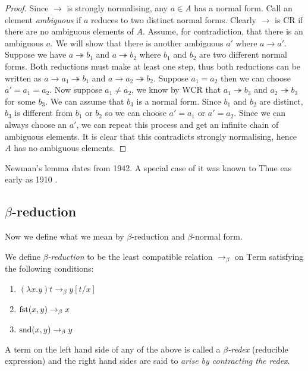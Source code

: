 \begin{proof}
    Since $\to$ is strongly normalising, any $a \in A$ has a normal form. Call an element \emph{ambiguous} if $a$ reduces to two distinct normal forms. Clearly $\to$ is CR if there are no ambiguous elements of $A$.
    Assume, for contradiction, that there is an ambiguous $a$. We will show that there is another ambiguous $a'$ where $a \to a'$.
    Suppose we have $a \twoheadrightarrow b_1$ and $a \twoheadrightarrow b_2$ where $b_1$ and $b_2$ are two different normal forms. Both reductions must make at least one step, thus both reductions can be written as $a \to a_1 \twoheadrightarrow b_1$ and $a \to a_2 \twoheadrightarrow b_2$.
    Suppose $a_1 = a_2$ then we can choose $a' = a_1 = a_2$. Now suppose $a_1 \neq a_2$, we know by WCR that $a_1 \twoheadrightarrow b_3$ and $a_2 \twoheadrightarrow b_3$ for some $b_3$. We can assume that $b_3$ is a normal form. Since $b_1$ and $b_2$ are distinct, $b_3$ is different from $b_1$ or $b_2$ so we can choose $a' = a_1$ or $a'=a_2$.
    Since we can always choose an $a'$, we can repeat this process and get an infinite chain of ambiguous elements. It is clear that this contradicts strongly normalising, hence $A$ has no ambiguous elements.
\end{proof}

\begin{remark}
    Newman's lemma dates from 1942. A special case of it was known to Thue eas early as 1910 \cite{Steinby_treesand}.
\end{remark}


\subsection{ \texorpdfstring{$\beta$}{}-reduction}

Now we define what we mean by $\beta$-reduction and $\beta$-normal form.

\begin{defin}\label{beta_reduction}
    We define \emph{$\beta$-reduction} to be the least compatible relation $\to_{\beta}$ on $\mathrm{Term}$ satisfying the following conditions:
    \begin{enumerate}
        \item $(\lambda x . y)t \to_{\beta} y [t / x]$
        \item $\mathrm{fst}(x,y) \to_{\beta} x$
        \item $\mathrm{snd}(x,y) \to_{\beta} y$
    \end{enumerate}
    A term on the left hand side of any of the above is called a \emph{$\beta$-redex} (reducible expression) and the right hand sides are said to \emph{arise by contracting the redex}.
\end{defin}

